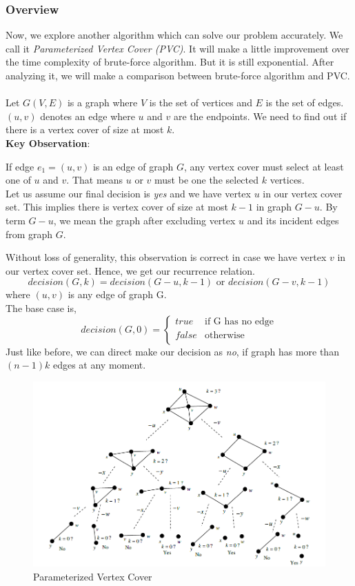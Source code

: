 \documentclass[12pt, a4paper]{article}
\begin{document}
	\subsubsection{Overview}
	Now, we explore another algorithm which can solve our problem accurately. We call it \textit{Parameterized Vertex Cover (PVC)}. It will make a little improvement over the time complexity of brute-force algorithm. But it is still exponential. After analyzing it, we will make a comparison between brute-force algorithm and PVC. \\ \\
	Let $G(V,E)$ is a graph where $V$ is the set of vertices and $E$ is the set of edges. $(u,v)$ denotes an edge where $u$ and $v$ are the endpoints. We need to find out if there is a vertex cover of size at most $k$.\\
	\textbf{Key Observation}:\par If edge $e_1=(u,v)$ is an edge of graph $G$, any vertex cover must select at least one of $u$ and $v$. That means $u$ or $v$ must be one the selected $k$ vertices. \\
	Let us assume our final decision is \textit{yes} and we have vertex $u$ in our vertex cover set. This implies there is vertex cover of size at most $k-1$ in graph $G - u$. By term $G - u$, we mean the graph after excluding vertex $u$ and its incident edges from graph $G$. \par
	Without loss of generality, this observation is correct in case we have vertex $v$ in our vertex cover set. Hence, we get our recurrence relation.
	$$decision(G, k) = decision(G-u,k-1) \text{ or } decision(G-v,k-1)$$
	where $(u,v)$ is any edge of graph G.\\
	The base case is,
	$$decision(G,0) = 
	\begin{cases}
		true & \text{if G has no edge} \\
		false & \text{otherwise} \\
	\end{cases}
	$$
	Just like before, we can direct make our decision as \textit{no}, if graph has more than $(n-1)k$ edges at any moment. \\
	\begin{figure}[h]
		\centering
		\includegraphics[scale=0.8]{pvc_sim.PNG}
		\caption{\label{fig:pvc}Parameterized Vertex Cover}
	\end{figure} \\
\end{document}
